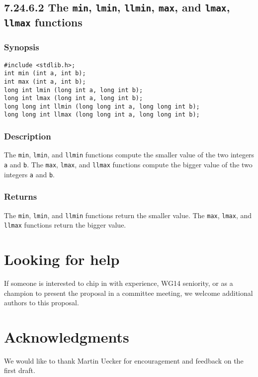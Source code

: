 \documentclass[a4paper,10pt]{scrartcl}
\begin{document}
\begin{mdframed}
    \subsection*{7.24.6.2 The \lstinline{min}, \lstinline{lmin}, \lstinline{llmin}, \lstinline{max}, and \lstinline{lmax}, \lstinline{llmax} functions}
    \subsubsection*{Synopsis}
    \begin{lstlisting}
#include <stdlib.h>;
int min (int a, int b);
int max (int a, int b);
long int lmin (long int a, long int b);
long int lmax (long int a, long int b);
long long int llmin (long long int a, long long int b);
long long int llmax (long long int a, long long int b);
    \end{lstlisting}
    \subsubsection*{Description}
    The \lstinline{min}, \lstinline{lmin}, and \lstinline{llmin} functions compute the smaller value of the two
    integers \lstinline{a} and \lstinline{b}.
    The \lstinline{max}, \lstinline{lmax}, and \lstinline{llmax} functions compute the bigger value of the two
    integers \lstinline{a} and \lstinline{b}.
    \subsubsection*{Returns}
    The \lstinline{min}, \lstinline{lmin}, and \lstinline{llmin} functions return the smaller value.
    The \lstinline{max}, \lstinline{lmax}, and \lstinline{llmax} functions return the bigger value.
\end{mdframed}

\section{Looking for help}
If someone is interested to chip in with experience, WG14 seniority, or as a champion to present the proposal in a committee meeting, we welcome additional authors to this proposal.

\section{Acknowledgments}
We would like to thank Martin Uecker for encouragement and feedback on the first draft.
\end{document}
